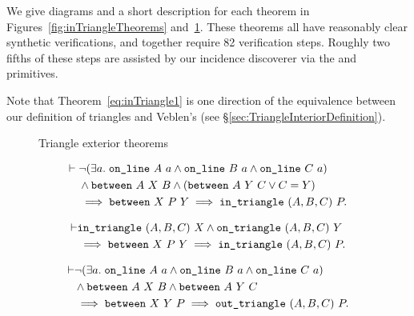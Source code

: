 We give diagrams and a short description for each theorem in Figures~\ref{fig:inTriangleTheorems} and~\ref{fig:outTriangleTheorems}. These theorems all have reasonably clear synthetic verifications, and together require 82 verification steps. Roughly two fifths of these steps are assisted by our incidence discoverer via the  and  primitives.

Note that Theorem~\ref{eq:inTriangle1} is one direction of the equivalence between our definition of triangles and Veblen's (see \S\ref{sec:TriangleInteriorDefinition}).

\begin{figure}
\centering{}
\qquad{}
\caption{Triangle exterior theorems}
\label{fig:outTriangleTheorems}
\end{figure}

\begin{equation}\label{eq:inTriangle1}
  \begin{split}
    \vdash\;&\neg(\exists a.\; \texttt{on\_line}\ A\ a\wedge \texttt{on\_line}\ B\ a\wedge \texttt{on\_line}\ C\ a)\\
    &\wedge \texttt{between}\ A\ X\ B \wedge (\texttt{between}\ A\ Y\ C \vee C = Y)\\
    &\implies \texttt{between}\ X\ P\ Y \implies \texttt{in\_triangle}\ (A,B,C)\ P.
  \end{split}
\end{equation}

\begin{equation}\label{eq:inTriangle2}
  \begin{split}
    \vdash&\texttt{in\_triangle}\ (A,B,C)\ X \wedge \texttt{on\_triangle}\ (A,B,C)\ Y\\
    &\implies \texttt{between}\ X\ P\ Y \implies \texttt{in\_triangle}\ (A,B,C)\ P.
  \end{split}
\end{equation}

\begin{equation}\label{eq:outTriangle1}
  \begin{split}
    \vdash&\neg(\exists a.\; \texttt{on\_line}\ A\ a\wedge \texttt{on\_line}\ B\ a\wedge \texttt{on\_line}\ C\ a)\\
    &\wedge \texttt{between}\ A\ X\ B \wedge \texttt{between}\ A\ Y\ C\\
    &\implies \texttt{between}\ X\ Y\ P \implies \texttt{out\_triangle}\ (A,B,C)\ P.
  \end{split}
\end{equation}

